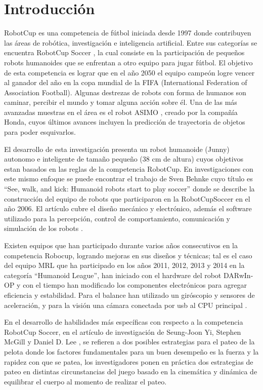 
\chapter{Introducción}\label{intro}


\label{sect:justificacion}
RobotCup \cite{robotcup} es una competencia de fútbol iniciada desde 1997 donde contribuyen las áreas de robótica, investigación e inteligencia artificial. Entre sus categorías se encuentra RobotCup Soccer \cite{robotcupsoccer}, la cual consiste en la participación de pequeños robots humanoides que se enfrentan a otro equipo para jugar fútbol. El objetivo de esta competencia es lograr que en el año 2050 el equipo campeón logre vencer al ganador del año en la copa mundial de la FIFA (International Federation of Association Football). Algunas destrezas de robots con forma de humanos  son caminar, percibir el mundo y tomar alguna acción sobre él. Una de las más avanzadas muestras en el área es el robot ASIMO \cite{asimo}, creado por la compañía Honda, cuyos últimos avances incluyen la predicción de trayectoria de objetos para poder esquivarlos.

El desarrollo de esta investigaci\'on presenta un robot humanoide (Junny) autonomo e inteligente de tamaño pequeño (38 cm de altura) cuyos objetivos estan basados en las reglas de la competencia RobotCup. En investigaciones con este mismo enfoque se puede encontrar el trabajo de Sven Behnke cuyo título es “See, walk, and kick: Humanoid robots start to play soccer” donde se describe la construcción del equipo de robots que participaron en la RobotCupSoccer en el a\~no 2006. El artículo cubre el diseño mecánico y electrónico, además el software utilizado para la percepción, control de comportamiento, comunicación y simulación de los robots \cite{paper}.

Existen equipos que han participado durante varios años consecutivos en la competencia Robocup, logrando mejoras en sus diseños y técnicas; tal es el caso del equipo MRL que ha participado en los años 2011, 2012, 2013 y 2014 en la categoría “Humanoid League”, han iniciado con el hardware del robot DARwIn-OP y con el tiempo han modificado los componentes electrónicos para agregar eficiencia y estabilidad. Para el balance han utilizado un giróscopio y sensores de aceleración, y para la visión una cámara conectada por usb al CPU principal \cite{paper1}.

En el desarrollo de habilidades más específicas con respecto a la competencia RobotCup Soccer, en el artículo de investigación de Seung-Joon Yi, Stephen McGill y Daniel D. Lee  \cite{paper2}, se refieren a dos posibles estrategias para el pateo de la pelota donde los factores fundamentales para un buen desempeño es la fuerza y la rapidez con que se patea, los investigadores ponen en pr\'actica dos estrategias de pateo en distintas circunstancias del juego basado en la cinemática y dinámica de equilibrar el cuerpo al momento de realizar el pateo.

